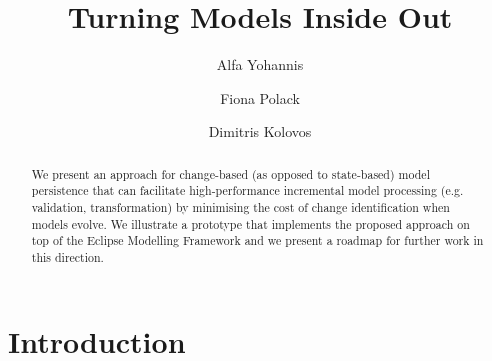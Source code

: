\documentclass{llncs}
\begin{document}
\renewcommand{\thelstlisting}{\arabic{lstlisting}}
\renewcommand{\labelitemi}{$\bullet$}
\newcommand{\dk}[1]{\textbf{[DK: #1]}}

\title{Turning Models Inside Out}
%
%
\author{Alfa Yohannis \and Fiona Polack \and Dimitris Kolovos}
%
%
%

\maketitle              %

\begin{abstract}
We present an approach for change-based (as opposed to state-based) model persistence that can facilitate high-performance incremental model processing (e.g. validation, transformation) by minimising the cost of change identification when models evolve. We illustrate a prototype that implements the proposed approach on top of the Eclipse Modelling Framework and we present a roadmap for further work in this direction.
\end{abstract}

\section{Introduction}
\label{Introduction}
\end{document}
